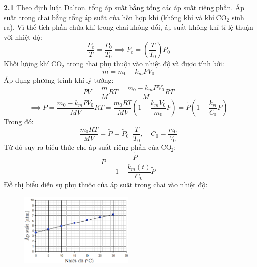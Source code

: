 \noindent\textbf{2.1} Theo định luật Dalton, tổng áp suất bằng tổng các áp suất riêng phần. Áp suất trong chai bằng tổng áp suất của hỗn hợp khí (không khí và khí $\text{CO}_2$ sinh ra). Vì thể tích phần chứa khí trong chai không đổi, áp suất không khí tỉ lệ thuận với nhiệt độ:
\begin{equation*}
  \frac{P_e}{T} = \frac{P_0}{T_0} \implies P_e = \left( \frac{T}{T_0} \right) P_0
\end{equation*}
Khối lượng khí $\text{CO}_2$ trong chai phụ thuộc vào nhiệt độ và được tính bởi:
\begin{equation*}
  m = m_0 - k_m P V_0
\end{equation*}
Áp dụng phương trình khí lý tưởng:
\begin{equation*}
  PV             = \frac{m}{M}RT = \frac{m_0 - k_m P V_0}{M} RT
\end{equation*}
\begin{equation*}
  \implies P  = \frac{m_0 - k_m P V_0}{M V} RT = \frac{m_0 RT}{M V} \left( 1 - \frac{k_m V_0}{m_0} P \right)  = \tilde{P} \left( 1 - \frac{k_m}{C_0} P \right)
\end{equation*}
Trong đó:
\begin{equation*}
  \frac{m_0 RT}{M V} = \tilde{P} = \tilde{P}_0 \cdot \frac{T}{T_0},
  \quad C_0 = \frac{m_0}{V_0}
\end{equation*}
Từ đó suy ra biểu thức cho áp suất riêng phần của $\text{CO}_2$:
\begin{equation*}
  P = \frac{\tilde{P}}{1 + \dfrac{k_m(t)}{C_0} \tilde{P}}
\end{equation*}
Đồ thị biểu diễn sự phụ thuộc của áp suất trong chai vào nhiệt độ:
\begin{figure}[H]
  \centering
  \includegraphics[width=0.5\textwidth]{Figures/Solutions/Fig 3.1.png}
\end{figure}



